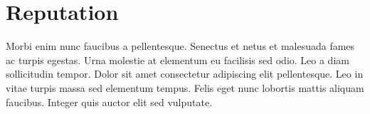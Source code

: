 \section{Reputation}
\label{sec:reputation}

Morbi enim nunc faucibus a pellentesque. Senectus et netus et malesuada fames ac turpis egestas. Urna molestie at elementum eu facilisis sed odio. Leo a diam sollicitudin tempor. Dolor sit amet consectetur adipiscing elit pellentesque. Leo in vitae turpis massa sed elementum tempus. Felis eget nunc lobortis mattis aliquam faucibus. Integer quis auctor elit sed vulputate.
